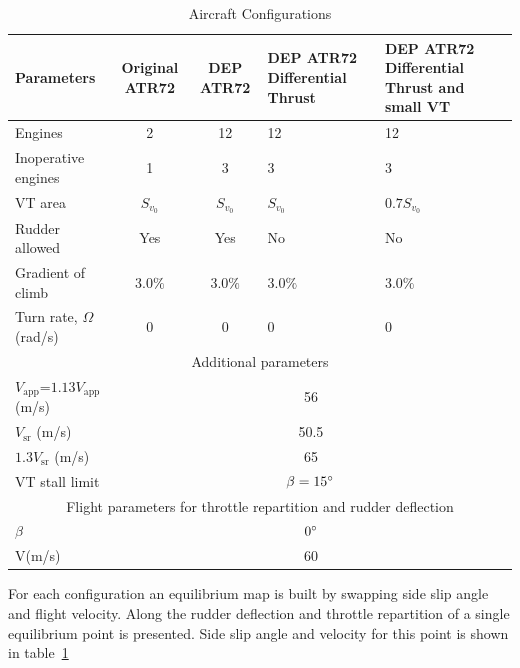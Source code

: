 \begin{table}[hbt]
	\caption{\label{tab:ConfigurationStudied} Aircraft Configurations}
	\centering
	\begin{tabular}{l|c|c|m{3cm}|m{3cm}}
		Parameters & Original ATR72 & DEP ATR72 & DEP ATR72 Differential Thrust & DEP ATR72 Differential Thrust and small VT\\
		\hline
		Engines & 2 & 12 & 12 & 12\\
		Inoperative engines & 1 & 3 & 3 & 3\\
		VT area & $S_{v_0}$ & $S_{v_0}$ & $S_{v_0}$ & $0.7 S_{v_0}$\\
		Rudder allowed & Yes & Yes & No & No\\
		Gradient of climb & $3.0\%$ &$3.0\%$ & $3.0\%$ & $3.0\%$\\
		Turn rate, $\Omega$ (rad/s)& 0 & 0& 0&0\\
		
		\hline
		\multicolumn{5}{c}{Additional parameters} \\
		\hline
		$V_{\textrm{app}}$=$1.13V_{\textrm{app}}$ (m/s)& \multicolumn{4}{c}{56}\\
		$V_{\textrm{sr}}$ (m/s)& \multicolumn{4}{c}{50.5}\\
		$1.3V_{\textrm{sr}}$ (m/s)& \multicolumn{4}{c}{65}\\
		VT stall limit & \multicolumn{4}{c}{$\beta=15\degree$}\\
		\hline
		\multicolumn{5}{c}{Flight parameters for throttle repartition and rudder deflection}\\
		\hline
		$\beta$ & \multicolumn{4}{c}{$0\degree$}\\
		V(m/s) & \multicolumn{4}{c}{60}\\
	\end{tabular}
\end{table}


For each configuration an equilibrium map is built by swapping side slip angle and flight velocity. Along the rudder deflection and throttle repartition of a single equilibrium point is presented. Side slip angle and velocity for this point is shown in table~\ref{tab:ConfigurationStudied}


